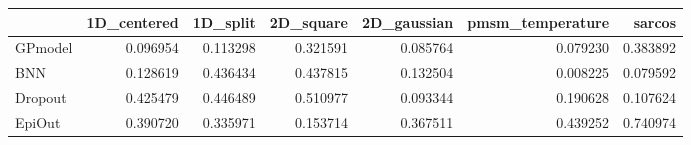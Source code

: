 \begin{tabular}{lrrrrrr}
\toprule
{} &  1D\_centered &  1D\_split &  2D\_square &  2D\_gaussian &  pmsm\_temperature &    sarcos \\
\midrule
GPmodel &     0.096954 &  0.113298 &   0.321591 &     0.085764 &          0.079230 &  0.383892 \\
BNN     &     0.128619 &  0.436434 &   0.437815 &     0.132504 &          0.008225 &  0.079592 \\
Dropout &     0.425479 &  0.446489 &   0.510977 &     0.093344 &          0.190628 &  0.107624 \\
EpiOut  &     0.390720 &  0.335971 &   0.153714 &     0.367511 &          0.439252 &  0.740974 \\
\bottomrule
\end{tabular}
